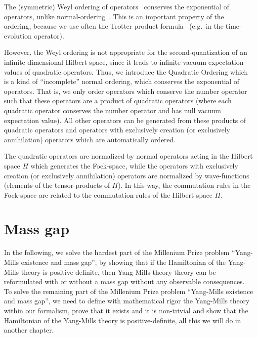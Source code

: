 \documentclass[11pt]{book}
\begin{document}
The (symmetric) Weyl ordering of
operators~\cite{Fujii2004New}\cite{Tao2012Some} conserves the
exponential of operators, unlike
normal-ordering~\cite{Blasiak2007Combinatorics}. This is an important
property of the ordering, because we use often the Trotter product
formula~\cite{Simon2005Functional}\cite{Hatano2005Finding} (e.g.~in the time-evolution operator).

However, the Weyl ordering is not appropriate for the
second-quantization of an infinite-dimensional Hilbert space, since it
leads to infinite vacuum expectation values of quadratic operators.
Thus, we introduce the Quadratic Ordering which is a kind of
``incomplete'' normal ordering, which conserves the exponential of
operators. That is, we only order operators which conserve the number
operator such that these operators are a product of quadratic operators
(where each quadratic operator conserves the number operator and has
null vacuum expectation value). All other operators can be generated
from these products of quadratic operators and operators with
exclusively creation (or exclusively annihilation) operators which are
automatically ordered.

The quadratic operators are normalized by normal operators acting in the
Hilbert space \(H\) which generates the Fock-space, while the operators
with exclusively creation (or exclusively annihilation) operators are
normalized by wave-functions (elements of the tensor-products of \(H\)).
In this way, the commutation rules in the Fock-space are related to the
commutation rules of the Hilbert space \(H\).

\hypertarget{mass-gap}{%
\section{Mass gap}\label{mass-gap}}

In the following, we solve the hardest part of the Millenium Prize
problem ``Yang-Mills existence and mass gap'', by showing that if the
Hamiltonian of the Yang-Mills theory is positive-definite, then
Yang-Mills theory theory can be reformulated with or without a mass gap
without any observable consequences. To solve the remaining part of the
Millenium Prize problem ``Yang-Mills existence and mass gap'', we need
to define with mathematical rigor the Yang-Mills theory within our
formalism, prove that it exists and it is non-trivial and show that the
Hamiltonian of the Yang-Mills theory is positive-definite, all this we
will do in another chapter.
\end{document}
